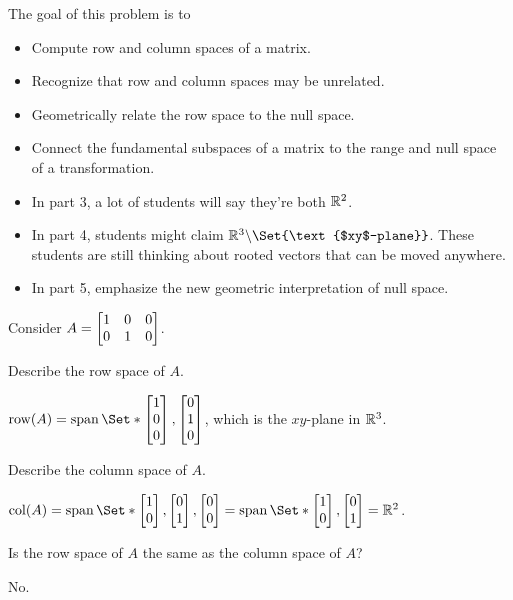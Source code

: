 \documentclass{workbook}
\newcommand{\displayonlynewpage}{\begin{displayonly}\newpage\end{displayonly}}
\newcommand{\bookonlynewpage}{\begin{bookonly}\newpage\end{bookonly}}
\begin{document}
\begin{slide}
	\displayonlynewpage
	\bookonlynewpage

	\question
	\begin{annotation}
		\begin{goals}

			The goal of this problem is to
			\begin{itemize}
				\item Compute row and column spaces of a matrix.
				\item Recognize that row and column spaces may be unrelated.
				\item Geometrically relate the row space to the null space.
				\item Connect the fundamental subspaces of a matrix to the
					range and null space of a transformation.
			\end{itemize}
		\end{goals}

		\begin{notes}
			\begin{itemize}
				\item In part 3, a lot of students will say they're both $\mathbb{R}^2$.
				\item In part 4, students might claim $\R^3\backslash\Set{\text{$xy$-plane}}$.
					These students are still thinking about rooted vectors that can be moved anywhere.
				\item In part 5, emphasize the new geometric interpretation of null space.
			\end{itemize}
		\end{notes}
	\end{annotation}
	\label{fundamentalSubspaces}
	Consider $A=\mat{1&0&0\\0&1&0}$.
	\begin{parts}
		\item Describe the row space of $A$.
			\begin{solution}
				$\Row(A) = \Span\Set*{\mat{1\\0\\0},\mat{0\\1\\0}}$,
				which is the $xy$-plane in $\mathbb{R}^3$.
			\end{solution}
		\item Describe the column space of $A$.
			\begin{solution}
				$\Col(A)=\Span\Set*{\mat{1\\0},\mat{0\\1},\mat{0\\0}}
					=\Span\Set*{\mat{1\\0},\mat{0\\1}}=\R^2$.
			\end{solution}
		\item Is the row space of $A$ the same as the column space of $A$?
			\begin{solution}
				No.


\end{solution}
\end{parts}
\end{slide}
\end{document}

